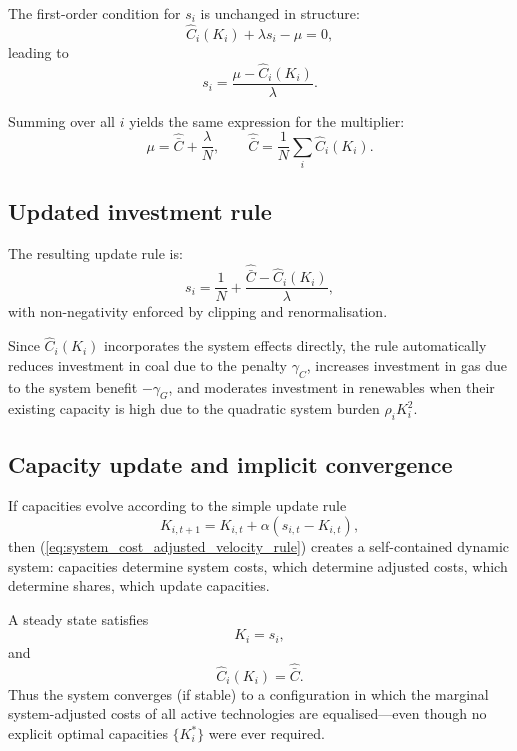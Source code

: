 \documentclass[preprint,authoryear,12pt]{elsarticle}
\begin{document}
The first-order condition for $s_i$ is unchanged in structure:
\begin{equation}
    \widehat{C}_i(K_i) + \lambda s_i - \mu = 0,
\end{equation}
leading to
\begin{equation}
    s_i = \frac{\mu - \widehat{C}_i(K_i)}{\lambda}.
\end{equation}

Summing over all $i$ yields the same expression for the multiplier:
\[
    \mu = \widehat{\bar{C}} + \frac{\lambda}{N},
    \qquad
    \widehat{\bar{C}} = \frac{1}{N} \sum_i \widehat{C}_i(K_i).
\]

\subsection*{Updated investment rule}

The resulting update rule is:
\begin{equation}
    s_i
    = \frac{1}{N}
      + \frac{\widehat{\bar{C}} - \widehat{C}_i(K_i)}{\lambda},
    \label{eq:system_cost_adjusted_velocity_rule}
\end{equation}
with non-negativity enforced by clipping and renormalisation.

Since $\widehat{C}_i(K_i)$ incorporates the system effects directly, the rule automatically reduces
investment in coal due to the penalty $\gamma_C$, increases investment in gas due to the system
benefit $-\gamma_G$, and moderates investment in renewables when their existing capacity is
high due to the quadratic system burden $\rho_i K_i^2$.

\subsection*{Capacity update and implicit convergence}

If capacities evolve according to the simple update rule
\begin{equation}
    K_{i,t+1} = K_{i,t} + \alpha (s_{i,t} - K_{i,t}),
    \label{eq:no_Kstar_capacity_update}
\end{equation}
then (\ref{eq:system_cost_adjusted_velocity_rule}) creates a self-contained dynamic system:
capacities determine system costs, which determine adjusted costs, which determine shares,
which update capacities.

A steady state satisfies
\[
    K_i = s_i,
\]
and
\[
    \widehat{C}_i(K_i) = \widehat{\bar{C}}.
\]
Thus the system converges (if stable) to a configuration in which the marginal system-adjusted
costs of all active technologies are equalised—even though no explicit optimal capacities
$\{K_i^*\}$ were ever required.
\end{document}
